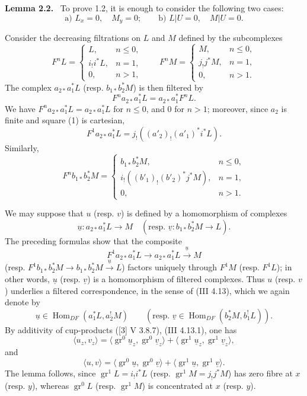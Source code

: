 \documentclass[11pt]{article}
\newenvironment{statement}[1]{\par\medskip\noindent\textbf{#1.}\ }{\par\medskip}
\DeclareMathOperator{\Hom}{Hom}
\providecommand{\Hom}{\operatorname{Hom}}
\providecommand{\Hom}{\operatorname{Hom}}
\begin{document}
\begin{statement}{Lemma 2.2}
To prove 1.2, it is enough to consider the following two cases:
\[
\text{a) } L_x=0,\quad M_y=0;\qquad
\text{b) } L|U=0,\quad M|U=0 .
\]
\end{statement}

Consider the decreasing filtrations on $L$ and $M$ defined by the subcomplexes
\[
F^nL=
\begin{cases}
L,& n\le 0,\\
i_!i^*L,& n=1,\\
0,& n>1,
\end{cases}
\qquad
F^nM=
\begin{cases}
M,& n\le 0,\\
j_!j^*M,& n=1,\\
0,& n>1.
\end{cases}
\]
The complex $a_{2*}a_1^*L$ (resp. $b_{1*}b_2^*M$) is then filtered by
\[
F^n a_{2*}a_1^*L=a_{2*}a_1^*F^nL.
\]
We have $F^n a_{2*}a_1^*L=a_{2*}a_1^*L$ for $n\le0$, and $0$ for $n>1$; moreover, since $a_2$ is finite and square (1) is cartesian,
\[
F^1a_{2*}a_1^*L=j_!((a'_2)_!(a'_1)^*i^*L).
\]
Similarly,
\[
F^n b_{1*}b_2^*M=
\begin{cases}
b_{1*}b_2^*M,& n\le 0,\\
i_!((b'_1)_!(b'_2)^*j^*M),& n=1,\\
0,& n>1.
\end{cases}
\]

We may suppose that $u$ (resp. $v$) is defined by a homomorphism of complexes
\[
\underline{u}:a_{2*}a_1^*L\longrightarrow M
\quad
(\text{resp. }\underline{v}:b_{1*}b_2^*M\longrightarrow L).
\]
The preceding formulas show that the composite
\[
F^1a_{2*}a_1^*L\longrightarrow a_{2*}a_1^*L\xrightarrow{\underline{u}}M
\]
(resp. $F^1b_{1*}b_2^*M\to b_{1*}b_2^*M\xrightarrow{\underline{u}}L$) factors uniquely through $F^1M$ (resp. $F^1L$); in other words, $\underline{u}$ (resp. $\underline{v}$) is a homomorphism of filtered complexes. Thus $u$ (resp. $v$) underlies a filtered correspondence, in the sense of (III 4.13), which we again denote by
\[
\underline{u}\in\Hom_{DF}(a_1^*L,a_2^!M)\qquad
(\text{resp. }\underline{v}\in\Hom_{DF}(b_2^*M,b_1^!L)).
\]
By additivity of cup-products ([3] V 3.8.7), (III 4.13.1), one has
\[
\langle u_z,v_z\rangle
 =\langle \operatorname{gr}^0\underline{u}_z,\operatorname{gr}^0\underline{v}_z\rangle
 +\langle \operatorname{gr}^1\underline{u}_z,\operatorname{gr}^1\underline{v}_z\rangle,
\]
and
\[
\langle u,v\rangle
 =\langle \operatorname{gr}^0\underline{u},\operatorname{gr}^0\underline{v}\rangle
 +\langle \operatorname{gr}^1\underline{u},\operatorname{gr}^1\underline{v}\rangle.
\]
The lemma follows, since $\operatorname{gr}^1L=i_!i^*L$ (resp. $\operatorname{gr}^1M=j_!j^*M$) has zero fibre at $x$ (resp. $y$), whereas $\operatorname{gr}^0L$ (resp. $\operatorname{gr}^1M$) is concentrated at $x$ (resp. $y$).
\end{document}
